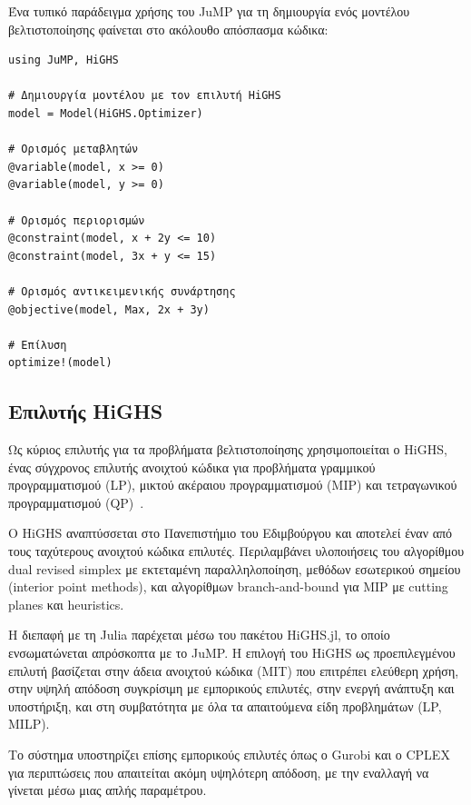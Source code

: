Ένα τυπικό παράδειγμα χρήσης του JuMP για τη δημιουργία ενός μοντέλου βελτιστοποίησης φαίνεται στο ακόλουθο απόσπασμα κώδικα:

\begin{samepage}
\begin{verbatim}
using JuMP, HiGHS

# Δημιουργία μοντέλου με τον επιλυτή HiGHS
model = Model(HiGHS.Optimizer)

# Ορισμός μεταβλητών
@variable(model, x >= 0)
@variable(model, y >= 0)

# Ορισμός περιορισμών
@constraint(model, x + 2y <= 10)
@constraint(model, 3x + y <= 15)

# Ορισμός αντικειμενικής συνάρτησης
@objective(model, Max, 2x + 3y)

# Επίλυση
optimize!(model)
\end{verbatim}
\end{samepage}

\subsection{Επιλυτής HiGHS}
\label{subsec:highs-solver}

Ως κύριος επιλυτής για τα προβλήματα βελτιστοποίησης χρησιμοποιείται ο HiGHS, ένας σύγχρονος επιλυτής ανοιχτού κώδικα για προβλήματα γραμμικού προγραμματισμού (LP), μικτού ακέραιου προγραμματισμού (MIP) και τετραγωνικού προγραμματισμού (QP)~\cite{highs2024}.

Ο HiGHS αναπτύσσεται στο Πανεπιστήμιο του Εδιμβούργου και αποτελεί έναν από τους ταχύτερους ανοιχτού κώδικα επιλυτές. Περιλαμβάνει υλοποιήσεις του αλγορίθμου dual revised simplex με εκτεταμένη παραλληλοποίηση, μεθόδων εσωτερικού σημείου (interior point methods), και αλγορίθμων branch-and-bound για MIP με cutting planes και heuristics.

Η διεπαφή με τη Julia παρέχεται μέσω του πακέτου HiGHS.jl, το οποίο ενσωματώνεται απρόσκοπτα με το JuMP. Η επιλογή του HiGHS ως προεπιλεγμένου επιλυτή βασίζεται στην άδεια ανοιχτού κώδικα (MIT) που επιτρέπει ελεύθερη χρήση, στην υψηλή απόδοση συγκρίσιμη με εμπορικούς επιλυτές, στην ενεργή ανάπτυξη και υποστήριξη, και στη συμβατότητα με όλα τα απαιτούμενα είδη προβλημάτων (LP, MILP).

Το σύστημα υποστηρίζει επίσης εμπορικούς επιλυτές όπως ο Gurobi και ο CPLEX για περιπτώσεις που απαιτείται ακόμη υψηλότερη απόδοση, με την εναλλαγή να γίνεται μέσω μιας απλής παραμέτρου.

